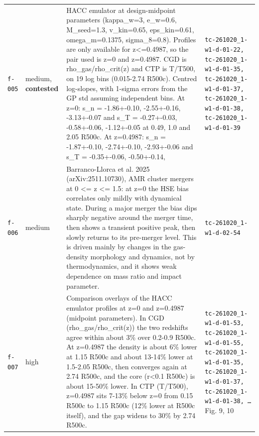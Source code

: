 \documentclass[11pt,a4paper]{article}
\begin{document}
\begin{longtable}{@{}p{}p{}p{}p{}@{}}
\texttt{f-005} & medium, \textbf{contested} & HACC emulator at design-midpoint parameters (kappa\_w=3, e\_w=0.6, M\_seed=1.3, v\_kin=0.65, eps\_kin=0.61, omega\_m=0.1375, sigma\_8=0.8). Profiles are only available for z\textless{}=0.4987, so the pair used is z=0 and z=0.4987. CGD is rho\_gas/rho\_crit(z) and CTP is T/T500, on 19 log bins (0.015-2.74 R500c). Centred log-slopes, with 1-sigma errors from the GP std assuming independent bins. At z=0: s\_n = -1.86+-0.10, -2.55+-0.16, -3.13+-0.07 and s\_T = -0.27+-0.03, -0.58+-0.06, -1.12+-0.05 at 0.49, 1.0 and 2.05 R500c. At z=0.4987: s\_n = -1.87+-0.10, -2.74+-0.10, -2.93+-0.06 and s\_T = -0.35+-0.06, -0.50+-0.14,  & \texttt{tc-261020\_\allowbreak{}1-w1-d-01-22,\allowbreak{} tc-261020\_\allowbreak{}1-w1-d-01-35,\allowbreak{} tc-261020\_\allowbreak{}1-w1-d-01-37,\allowbreak{} tc-261020\_\allowbreak{}1-w1-d-01-38,\allowbreak{} tc-261020\_\allowbreak{}1-w1-d-01-39} \\
\texttt{f-006} & medium & Barranco-Llorca et al. 2025 (arXiv:2511.10730), AMR cluster mergers at 0 \textless{}= z \textless{}= 1.5: at z=0 the HSE bias correlates only mildly with dynamical state. During a major merger the bias dips sharply negative around the merger time, then shows a transient positive peak, then slowly returns to its pre-merger level. This is driven mainly by changes in the gas-density morphology and dynamics, not by thermodynamics, and it shows weak dependence on mass ratio and impact parameter. & \texttt{tc-261020\_\allowbreak{}1-w1-d-02-54} \\
\texttt{f-007} & high & Comparison overlays of the HACC emulator profiles at z=0 and z=0.4987 (midpoint parameters). In CGD (rho\_gas/rho\_crit(z)) the two redshifts agree within about 3\% over 0.2-0.9 R500c. At z=0.4987 the density is about 6\% lower at 1.15 R500c and about 13-14\% lower at 1.5-2.05 R500c, then converges again at 2.74 R500c, and the core (r\textless{}0.1 R500c) is about 15-50\% lower. In CTP (T/T500), z=0.4987 sits 7-13\% below z=0 from 0.15 R500c to 1.15 R500c (12\% lower at R500c itself), and the gap widens to 30\% by 2.74 R500c. & \texttt{tc-261020\_\allowbreak{}1-w1-d-01-53,\allowbreak{} tc-261020\_\allowbreak{}1-w1-d-01-55,\allowbreak{} tc-261020\_\allowbreak{}1-w1-d-01-35,\allowbreak{} tc-261020\_\allowbreak{}1-w1-d-01-37,\allowbreak{} tc-261020\_\allowbreak{}1-w1-d-01-38,\allowbreak{} \ldots{}\allowbreak{}} Fig. 9, 10 \\

\end{longtable}
\end{document}
